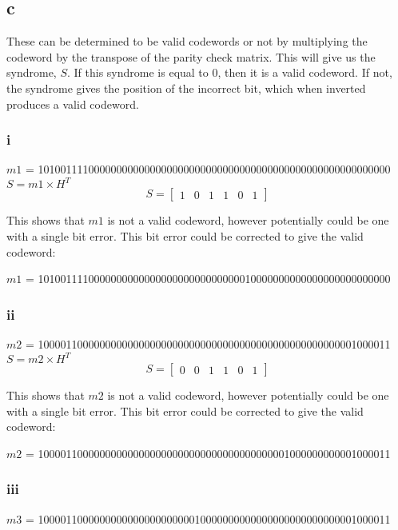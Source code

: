\subsection{c}
These can be determined to be valid codewords or not by multiplying the codeword by the transpose of the parity check matrix.
This will give us the syndrome, $S$.
If this syndrome is equal to 0, then it is a valid codeword.
If not, the syndrome gives the position of the incorrect bit, which when inverted produces a valid codeword.

\subsubsection{i}
$m1$ = 101001111000000000000000000000000000000000000000000000000000000	\\

$S = m1 \times H^{T}$ \\
\[ S = \left[ \begin{array}{cccccc} 1 & 0 & 1 & 1 & 0 & 1 \end{array} \right] \]

This shows that $m1$ is not a valid codeword, however potentially could be one with a single bit error.
This bit error could be corrected to give the valid codeword:

\noindent $m1$ = 101001111000000000000000000000000000010000000000000000000000000

\subsubsection{ii}
$m2$ = 100001100000000000000000000000000000000000000000000000001000011	\\

$S = m2 \times H^{T}$ \\
\[ S = \left[ \begin{array}{cccccc} 0 & 0 & 1 & 1 & 0 & 1 \end{array} \right] \]

This shows that $m2$ is not a valid codeword, however potentially could be one with a single bit error.
This bit error could be corrected to give the valid codeword:

$m2$ = 100001100000000000000000000000000000000000001000000000001000011	\\

\subsubsection{iii}
$m3$ = 100001100000000000000000000010000000000000000000000000001000011	\\

